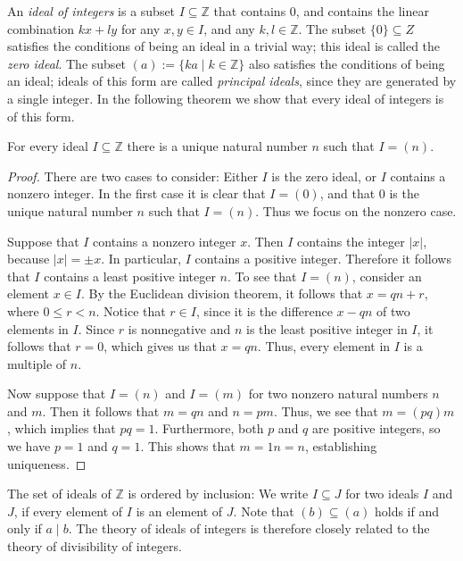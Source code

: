 An \emph{ideal of integers} is a subset $I\subseteq \mathbb{Z}$ that contains $0$, and contains the linear combination $kx+ly$ for any $x,y\in I$, and any $k,l\in\mathbb{Z}$. The subset $\{0\}\subseteq{Z}$ satisfies the conditions of being an ideal in a trivial way; this ideal is called the \emph{zero ideal}. The subset $(a):=\{ka \mid k\in\mathbb{Z}\}$ also satisfies the conditions of being an ideal; ideals of this form are called \emph{principal ideals}, since they are generated by a single integer. In the following theorem we show that every ideal of integers is of this form.

\begin{theorem}
  \label{theorem:integers-principal-ideal-domain}
  For every ideal $I\subseteq\mathbb{Z}$ there is a unique natural number $n$ such that $I=(n)$.
\end{theorem}

\begin{proof}
  There are two cases to consider: Either $I$ is the zero ideal, or $I$ contains a nonzero integer. In the first case it is clear that $I=(0)$, and that $0$ is the unique natural number $n$ such that $I=(n)$. Thus we focus on the nonzero case.

  Suppose that $I$ contains a nonzero integer $x$. Then $I$ contains the integer $|x|$, because $|x|=\pm x$. In particular, $I$ contains a positive integer. Therefore it follows that $I$ contains a least positive integer $n$. To see that $I=(n)$, consider an element $x\in I$. By the Euclidean division theorem, it follows that $x=qn+r$, where $0\leq r<n$. Notice that $r\in I$, since it is the difference $x-qn$ of two elements in $I$. Since $r$ is nonnegative and $n$ is the least positive integer in $I$, it follows that $r=0$, which gives us that $x=qn$. Thus, every element in $I$ is a multiple of $n$.

  Now suppose that $I=(n)$ and $I=(m)$ for two nonzero natural numbers $n$ and $m$. Then it follows that $m=qn$ and $n=pm$. Thus, we see that $m=(pq)m$, which implies that $pq=1$. Furthermore, both $p$ and $q$ are positive integers, so we have $p=1$ and $q=1$. This shows that $m=1n=n$, establishing uniqueness.
\end{proof}

The set of ideals of $\mathbb{Z}$ is ordered by inclusion: We write $I\subseteq J$ for two ideals $I$ and $J$, if every element of $I$ is an element of $J$. Note that $(b)\subseteq (a)$ holds if and only if $a\mid b$. The theory of ideals of integers is therefore closely related to the theory of divisibility of integers.

